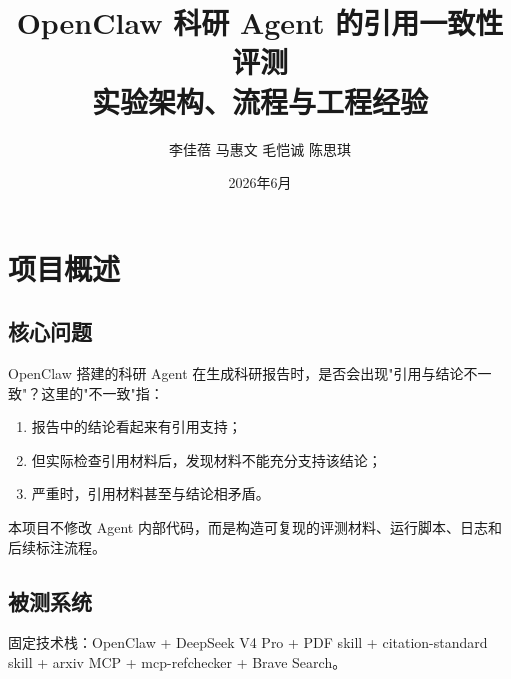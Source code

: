 \documentclass[UTF8,fontset=fandol,a4paper,12pt]{ctexart}
\title{\textbf{OpenClaw 科研 Agent 的引用一致性评测}\\[0.3em]
       \large 实验架构、流程与工程经验}
\author{李佳蓓 \quad 马惠文 \quad 毛恺诚 \quad 陈思琪}
\date{2026年6月}
\begin{document}
\maketitle
\thispagestyle{empty}

\tableofcontents
\newpage

\section{项目概述}

\subsection{核心问题}

OpenClaw 搭建的科研 Agent 在生成科研报告时，是否会出现"引用与结论不一致"？这里的"不一致"指：
\begin{enumerate}[nosep]
  \item 报告中的结论看起来有引用支持；
  \item 但实际检查引用材料后，发现材料不能充分支持该结论；
  \item 严重时，引用材料甚至与结论相矛盾。
\end{enumerate}

本项目不修改 Agent 内部代码，而是构造可复现的评测材料、运行脚本、日志和后续标注流程。

\subsection{被测系统}

固定技术栈：OpenClaw + DeepSeek V4 Pro + PDF skill + citation-standard skill + arxiv MCP + mcp-refchecker + Brave Search。
\end{document}

